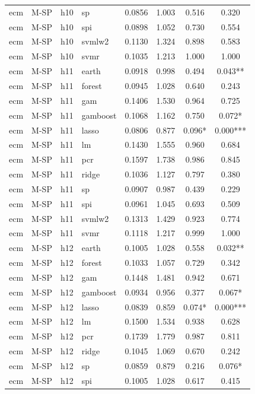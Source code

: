 \begin{ThreePartTable}
\begin{longtable}[t]{llclcccc}
ecm & M-SP & h10 & sp & 0.0856 & 1.003 & 0.516 & 0.320\\
ecm & M-SP & h10 & spi & 0.0898 & 1.052 & 0.730 & 0.554\\
ecm & M-SP & h10 & svmlw2 & 0.1130 & 1.324 & 0.898 & 0.583\\
ecm & M-SP & h10 & svmr & 0.1035 & 1.213 & 1.000 & 1.000\\
\addlinespace
ecm & M-SP & h11 & earth & 0.0918 & 0.998 & 0.494 & 0.043**\\
ecm & M-SP & h11 & forest & 0.0945 & 1.028 & 0.640 & 0.243\\
ecm & M-SP & h11 & gam & 0.1406 & 1.530 & 0.964 & 0.725\\
ecm & M-SP & h11 & gamboost & 0.1068 & 1.162 & 0.750 & 0.072*\\
ecm & M-SP & h11 & lasso & 0.0806 & 0.877 & 0.096* & 0.000***\\
ecm & M-SP & h11 & lm & 0.1430 & 1.555 & 0.960 & 0.684\\
ecm & M-SP & h11 & pcr & 0.1597 & 1.738 & 0.986 & 0.845\\
ecm & M-SP & h11 & ridge & 0.1036 & 1.127 & 0.797 & 0.380\\
ecm & M-SP & h11 & sp & 0.0907 & 0.987 & 0.439 & 0.229\\
ecm & M-SP & h11 & spi & 0.0961 & 1.045 & 0.693 & 0.509\\
ecm & M-SP & h11 & svmlw2 & 0.1313 & 1.429 & 0.923 & 0.774\\
ecm & M-SP & h11 & svmr & 0.1118 & 1.217 & 0.999 & 1.000\\
\addlinespace
ecm & M-SP & h12 & earth & 0.1005 & 1.028 & 0.558 & 0.032**\\
ecm & M-SP & h12 & forest & 0.1033 & 1.057 & 0.729 & 0.342\\
ecm & M-SP & h12 & gam & 0.1448 & 1.481 & 0.942 & 0.671\\
ecm & M-SP & h12 & gamboost & 0.0934 & 0.956 & 0.377 & 0.067*\\
ecm & M-SP & h12 & lasso & 0.0839 & 0.859 & 0.074* & 0.000***\\
ecm & M-SP & h12 & lm & 0.1500 & 1.534 & 0.938 & 0.628\\
ecm & M-SP & h12 & pcr & 0.1739 & 1.779 & 0.987 & 0.811\\
ecm & M-SP & h12 & ridge & 0.1045 & 1.069 & 0.670 & 0.242\\
ecm & M-SP & h12 & sp & 0.0859 & 0.879 & 0.216 & 0.076*\\
ecm & M-SP & h12 & spi & 0.1005 & 1.028 & 0.617 & 0.415\\

\end{longtable}
\end{ThreePartTable}

